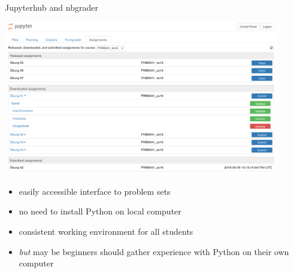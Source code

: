 \documentclass[svgnames]{beamer}
\newcommand\but{\alert{\textit{but}} }
\begin{document}
\begin{frame}{Jupyterhub and nbgrader}

 \begin{center}
 \includegraphics[width=0.9\textwidth]{jupyterhub_nbgrader}
 \end{center}
 \begin{itemize}
  \item easily accessible interface to problem sets
  \item no need to install Python on local computer
  \item consistent working environment for all students
  \item \but may be beginners should gather experience with Python
	on their own computer
 \end{itemize}
\end{frame}
\end{document}
